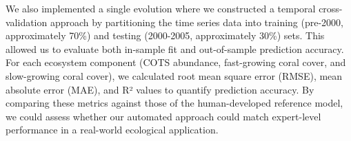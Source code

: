 We also implemented a single evolution where we constructed a temporal cross-validation approach by partitioning the time series data into training (pre-2000, approximately 70\%) and testing (2000-2005, approximately 30\%) sets. This allowed us to evaluate both in-sample fit and out-of-sample prediction accuracy. For each ecosystem component (COTS abundance, fast-growing coral cover, and slow-growing coral cover), we calculated root mean square error (RMSE), mean absolute error (MAE), and R² values to quantify prediction accuracy. By comparing these metrics against those of the human-developed reference model, we could assess whether our automated approach could match expert-level performance in a real-world ecological application.



